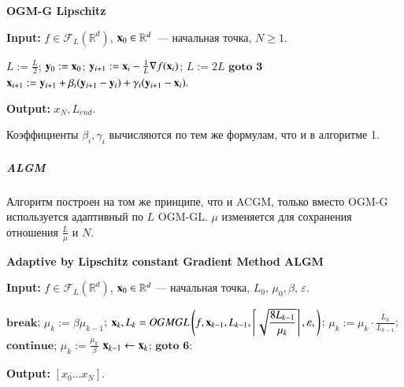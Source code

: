 \documentclass{crm-article}
\begin{document}
\begin{algorithm}
\caption{\bf{OGM-G Lipschitz}}
\label{OGM-GL}
\hspace*{\algorithmicindent} \textbf{Input: }$f\in \mathcal{F}_L(\mathbb{R}^d)$, ${\bf x}_0\in\mathbb{R}^d$~--- начальная точка, $N\geq 1$.
\begin{algorithmic}[1]
\STATE $L := \frac{L}{2}$;
\STATE ${\bf y}_0 := {\bf x}_0$;
\STATE ${\bf y}_{i+1} := {\bf x}_i - \frac{1}{L}\nabla f({\bf x}_i)$;
\STATE $L := 2L$
\STATE $\textbf{goto 3}$
\ENDIF
\STATE ${\bf x}_{i+1} := {\bf y}_{i+1} + \beta_i({\bf y}_{i+1} - {\bf y}_i) + \gamma_i({\bf y}_{i+1} - {\bf x}_i).$
\ENDFOR
\end{algorithmic}
\hspace*{\algorithmicindent} \textbf{Output: } $x_N, L_{end}$.
\end{algorithm}


Коэффициенты $\beta_i, \gamma_i$ вычисляются по тем же формулам, что и в алгоритме 1. 

\subparagraph{ALGM}

Алгоритм построен на том же принципе, что и ACGM, только вместо OGM-G используется адаптивный по $L$ OGM-GL. $\mu$ изменяется для сохранения отношения $\frac{L}{\mu}$ и $N$.

\begin{algorithm}
\caption{\bf{Adaptive by Lipschitz constant Gradient Method ALGM}}
\label{ALGM}
\hspace*{\algorithmicindent} \textbf{Input: } $f\in \mathcal{F}_L(\mathbb{R}^d)$, ${\bf x}_0\in\mathbb{R}^d$ --- начальная точка, $L_0$, $\mu_0, \beta$, $\varepsilon$.
\begin{algorithmic}[1]
\STATE $\textbf{break}$;
\ENDIF
\STATE $\mu_k:=\beta\mu_{k-1}$;
\STATE ${\bf x}_k, L_k = OGMGL\left(f, {\bf x}_{k-1}, L_{k-1}, \left\lceil \sqrt{\dfrac{8L_{k-1}}{\mu_k}}\right\rceil, \varepsilon, \right)$;
\STATE $\mu_k := \mu_k\cdot\frac{L_{k_{}}}{L_{k-1}}$;
\STATE $\textbf{continue}$;
\ENDIF
\STATE $\mu_k:=\frac{\mu_k}{\beta}$
\STATE ${\bf x}_{k-1}\leftarrow{\bf x}_k$;
\ENDIF
\STATE $\textbf{goto 6}$:
\ENDFOR
\end{algorithmic}
\hspace*{\algorithmicindent} \textbf{Output: } $[x_0\ldots x_N]$.
\end{algorithm}
\end{document}
